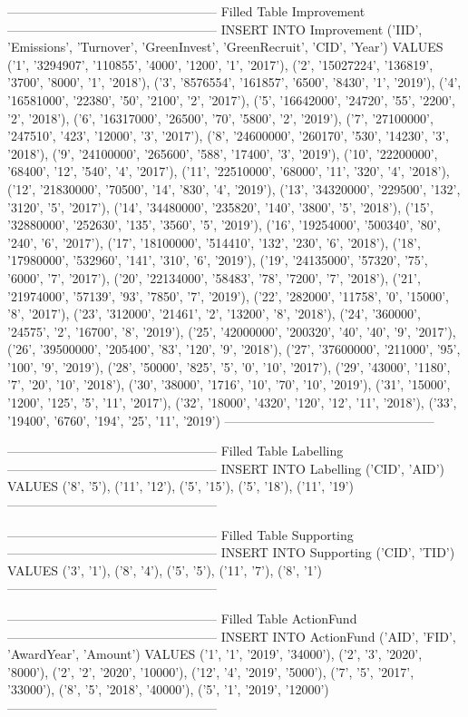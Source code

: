 --------------------------------------------------
Filled Table Improvement
--------------------------------------------------
INSERT INTO 
Improvement ('IID', 'Emissions', 'Turnover', 'GreenInvest', 'GreenRecruit', 'CID', 'Year')
VALUES ('1', '3294907', '110855', '4000', '1200', '1', '2017'),
	('2', '15027224', '136819', '3700', '8000', '1', '2018'),
	('3', '8576554', '161857', '6500', '8430', '1', '2019'),
	('4', '16581000', '22380', '50', '2100', '2', '2017'),
	('5', '16642000', '24720', '55', '2200', '2', '2018'),
	('6', '16317000', '26500', '70', '5800', '2', '2019'),
	('7', '27100000', '247510', '423', '12000', '3', '2017'),
	('8', '24600000', '260170', '530', '14230', '3', '2018'),
	('9', '24100000', '265600', '588', '17400', '3', '2019'),
	('10', '22200000', '68400', '12', '540', '4', '2017'),
	('11', '22510000', '68000', '11', '320', '4', '2018'),
	('12', '21830000', '70500', '14', '830', '4', '2019'),
	('13', '34320000', '229500', '132', '3120', '5', '2017'),
	('14', '34480000', '235820', '140', '3800', '5', '2018'),
	('15', '32880000', '252630', '135', '3560', '5', '2019'),
	('16', '19254000', '500340', '80', '240', '6', '2017'),
	('17', '18100000', '514410', '132', '230', '6', '2018'),
	('18', '17980000', '532960', '141', '310', '6', '2019'),
	('19', '24135000', '57320', '75', '6000', '7', '2017'),
	('20', '22134000', '58483', '78', '7200', '7', '2018'),
	('21', '21974000', '57139', '93', '7850', '7', '2019'),
	('22', '282000', '11758', '0', '15000', '8', '2017'),
	('23', '312000', '21461', '2', '13200', '8', '2018'),
	('24', '360000', '24575', '2', '16700', '8', '2019'),
	('25', '42000000', '200320', '40', '40', '9', '2017'),
	('26', '39500000', '205400', '83', '120', '9', '2018'),
	('27', '37600000', '211000', '95', '100', '9', '2019'),
	('28', '50000', '825', '5', '0', '10', '2017'),
	('29', '43000', '1180', '7', '20', '10', '2018'),
	('30', '38000', '1716', '10', '70', '10', '2019'),
	('31', '15000', '1200', '125', '5', '11', '2017'),
	('32', '18000', '4320', '120', '12', '11', '2018'),
	('33', '19400', '6760', '194', '25', '11', '2019')
--------------------------------------------------

--------------------------------------------------
Filled Table Labelling
--------------------------------------------------
INSERT INTO 
Labelling ('CID', 'AID')
VALUES ('8', '5'),
	('11', '12'),
	('5', '15'),
	('5', '18'),
	('11', '19')
--------------------------------------------------

--------------------------------------------------
Filled Table Supporting
--------------------------------------------------
INSERT INTO 
Supporting ('CID', 'TID')
VALUES ('3', '1'),
	('8', '4'),
	('5', '5'),
	('11', '7'),
	('8', '1')
--------------------------------------------------

--------------------------------------------------
Filled Table ActionFund
--------------------------------------------------
INSERT INTO 
ActionFund ('AID', 'FID', 'AwardYear', 'Amount')
VALUES ('1', '1', '2019', '34000'),
	('2', '3', '2020', '8000'),
	('2', '2', '2020', '10000'),
	('12', '4', '2019', '5000'),
	('7', '5', '2017', '33000'),
	('8', '5', '2018', '40000'),
	('5', '1', '2019', '12000')
--------------------------------------------------

